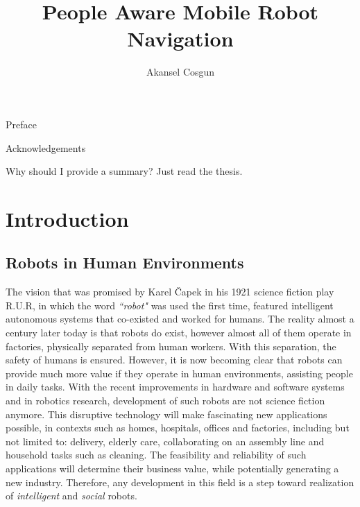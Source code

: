 \documentclass[12pt]{gatech-thesis}
\title{People Aware Mobile Robot Navigation} %
\author{Akansel Cosgun}
\begin{document}
%

\begin{preliminary}



\begin{preface}
Preface
\end{preface}
\begin{acknowledgements}
Acknowledgements
\end{acknowledgements}
\contents
\begin{summary}
Why should I provide a summary?  Just read the thesis.
\end{summary}
\end{preliminary}

%

\chapter{Introduction}
\label{chapter:introduction}


\section{Robots in Human Environments}

The vision that was promised by Karel \v{C}apek in his 1921 science fiction play R.U.R, in which the word \textit{``robot"} was used the first time, featured intelligent autonomous systems that co-existed and worked for humans. The reality almost a century later today is that robots do exist, however almost all of them operate in factories, physically separated from human workers. With this separation, the safety of humans is ensured. However, it is now becoming clear that robots can provide much more value if they operate in human environments, assisting people in daily tasks. With the recent improvements in hardware and software systems and in robotics research, development of such robots are not science fiction anymore. This disruptive technology will make fascinating new applications possible, in contexts such as homes, hospitals, offices and factories, including but not limited to: delivery, elderly care, collaborating on an assembly line and household tasks such as cleaning. The feasibility and reliability of such applications will determine their business value, while potentially generating a new industry. Therefore, any development in this field is a step toward realization of \textit{intelligent} and \textit{social} robots.
\end{document}
